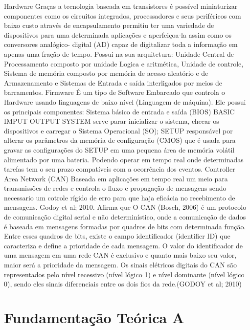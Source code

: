 {Hardware 
Graças a tecnologia baseada em transistores é possível miniaturizar componentes como os circuitos integrados, processadores e seus periféricos com baixo custo através de encapsulamento permitiu ter uma variedade de dispositivos para uma determinada aplicações e aperfeiçoa-la assim como os conversores analógico- digital (AD) capaz de digitalizar toda a informação em apenas uma fração de tempo.  Possui na sua arquitetura: Unidade Central de Processamento composto por unidade Logica e aritmética, Unidade de controle, Sistema de memória composto por memória de acesso aleatório e de Armazenamento e Sistemas de Entrada e saída interligados por meios de barramentos.
Firmware
É um tipo de Software Embarcado que controla o Hardware usando linguagens de baixo nível (Linguagem de máquina). Ele possui os principais componentes: Sistema básico de entrada e saída (BIOS) BASIC IMPUT OUTPUT SYSTEM serve parar inicializar o sistema, checar os dispositivos e carregar o Sistema Operacional (SO); SETUP responsável por alterar os parâmetros da memória de configuração (CMOS) que é usada para gravar as configurações do SETUP em uma pequena área de memória volátil alimentado por uma bateria. Podendo operar em tempo real onde determinadas tarefas tem o seu prazo compatíveis com a ocorrência dos eventos.
Controller Area Network (CAN)
Baseada em aplicações em tempo real um meio para transmissões de redes e controla o fluxo e propagação de mensagens sendo necessario um cotrole rígido de erro para que haja eficácia no recebimento de mensagens.
Godoy et al; 2010. Afirma que O CAN (Bosch, 2006) é um protocolo de comunicação digital serial e não determinístico, onde a comunicação de dados é baseada em mensagens formadas por quadros de bits com determinada função. Entre esses quadros de bits, existe o campo identificador (identifier ID) que caracteriza e define a prioridade de cada mensagem. O valor do identificador de uma mensagem em uma rede CAN é exclusivo e quanto mais baixo seu valor, maior será a prioridade da mensagem. Os sinais elétricos digitais do CAN são representados pelo nível recessivo (nível lógico 1) e nível dominante (nível lógico 0), sendo eles sinais diferenciais entre os dois fios da rede.(GODOY et al; 2010)
}
\label{cap:fundamentacao-teorica}



\section{Fundamentação Teórica A}

